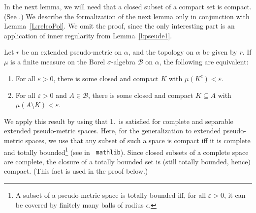 \documentclass[lean]{AFM}
\begin{document}
In the next lemma, we will need that a closed subset of a compact set
is compact. (See .) We describe
the formalization of the next lemma only in conjunction with
Lemma~\ref{L:relcoPol}. We omit the proof, since the
  only interesting part is an application of inner regularity from
  Lemma~\ref{l:pseude1}.

\begin{lemma}\label{l:tight}
  Let $r$ be an extended pseudo-metric on $\alpha$, and the topology
  on $\alpha$ be given by $r$. If $\mu$ is a finite measure on the
  Borel $\sigma$-algebra $\mathcal B$ on $\alpha$, the following are
  equivalent:
  \begin{enumerate}
    \item For all $\varepsilon>0$, there is some closed and compact
      $K$ with $\mu(K^c) < \varepsilon$.
    \item For all $\varepsilon>0$ and $A \in \mathcal B$, there is
      some closed and compact $K\subseteq A$ with $\mu(A \setminus K)
      < \varepsilon$.
  \end{enumerate}
\end{lemma}


We apply this result by using that 1.\ is satisfied for complete and
separable extended pseudo-metric spaces. Here, for the generalization
to extended pseudo-metric spaces, we use that any subset of such a
space is compact iff it is complete and totally
bounded\footnote{\label{note:tot}A subset of a pseudo-metric space is
  totally bounded iff, for all $\varepsilon>0$, it can be covered by
  finitely many balls of radius $\epsilon$.} (see
 in {\tt
  mathlib}). Since closed subsets of a complete space are complete,
the closure of a totally bounded set is (still totally bounded, hence)
compact. (This fact is used in the proof below.)
\end{document}
